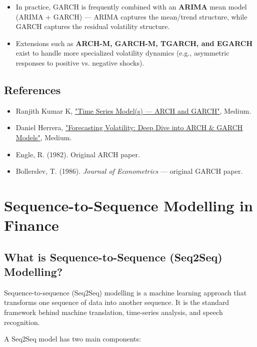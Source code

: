 \documentclass[12pt,openany]{book}
\theoremstyle{definition}
\theoremstyle{remark}
\begin{document}
\begin{itemize}
\item In practice, GARCH is frequently combined with an \textbf{ARIMA} mean model (ARIMA + GARCH) — ARIMA captures the mean/trend structure, while GARCH captures the residual volatility structure.
\item Extensions such as \textbf{ARCH-M, GARCH-M, TGARCH, and EGARCH} exist to handle more specialized volatility dynamics (e.g., asymmetric responses to positive vs. negative shocks).
\end{itemize}


\section{References}

\begin{itemize}
\item Ranjith Kumar K, \href{https://medium.com/@ranjithkumar.rocking/time-series-model-s-arch-and-garch-2781a982b448}{"Time Series Model(s) — ARCH and GARCH"}, Medium.
\item Daniel Herrera, \href{https://medium.com/@corredaniel1500/forecasting-volatility-deep-dive-into-arch-garch-models-46cd1945872b}{"Forecasting Volatility: Deep Dive into ARCH \& GARCH Models"}, Medium.
\item Engle, R. (1982). Original ARCH paper.
\item Bollerslev, T. (1986). \emph{Journal of Econometrics} — original GARCH paper.
\end{itemize}

\chapter{Sequence-to-Sequence Modelling in Finance}

\section{What is Sequence-to-Sequence (Seq2Seq) Modelling?}

Sequence-to-sequence (Seq2Seq) modelling is a machine learning approach that transforms one sequence of data into another sequence. It is the standard framework behind machine translation, time-series analysis, and speech recognition.

A Seq2Seq model has two main components:
\end{document}
